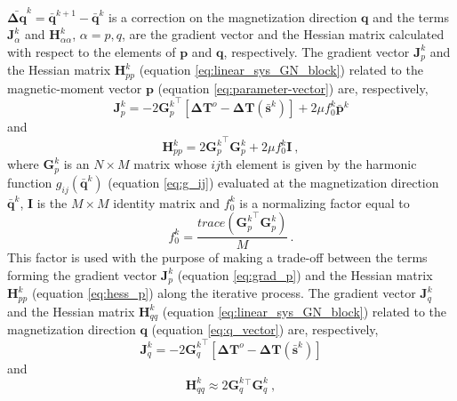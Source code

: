 $\bar{\mathbf{\Delta q}}^{k} = \bar{\mathbf{q}}^{k+1} - \bar{\mathbf{q}}^{k}$ 
is a correction on the magnetization direction $\mathbf{q}$ and the terms 
$\mathbf{J}_{\alpha}^{k}$ and $\mathbf{H}_{\alpha \alpha}^{k}$, $\alpha = p,q$, 
are the gradient vector and the Hessian matrix calculated with respect to the elements of 
$\mathbf{p}$ and $\mathbf{q}$, respectively. 
The gradient vector $\mathbf{J}_{p}^{k}$ and the Hessian matrix $\mathbf{H}_{pp}^{k}$ 
(equation \ref{eq:linear_sys_GN_block}) related to the magnetic-moment vector 
$\mathbf{p}$ (equation \ref{eq:parameter-vector}) are, respectively,
\begin{equation}
\mathbf{J}_{p}^{k} = -2 {\mathbf{G}_{p}^{k}}^{\top} 
\left[ \mathbf{\Delta T}^{o} - \mathbf{\Delta T} (\bar{\mathbf{s}}^{k}) \right] + 
2\mu f_{0}^{k} \bar{\mathbf{p}}^{k} 
\label{eq:grad_p}
\end{equation}   
and   
\begin{equation}
\mathbf{H}_{pp}^{k} = 2 {\mathbf{G}_{p}^{k}}^{\top} \mathbf{G}_{p}^{k} + 
2 \mu f_{0}^{k} \mathbf{I} \: ,
\label{eq:hess_p}
\end{equation}
where $\mathbf{G}_p^{k}$ is an $N \times M$ matrix whose $ij$th element is given by the harmonic 
function $g_{ij}(\bar{\mathbf{q}}^{k})$ (equation \ref{eq:g_ij}) evaluated at the 
magnetization direction $\bar{\mathbf{q}}^{k}$, $\mathbf{I}$ is the $M \times M$ identity matrix and 
$f_{0}^{k}$ is a  normalizing factor equal to
\begin{equation}
f_{0}^{k} = \dfrac{trace \left({\mathbf{G}_{p}^{k}}^{\top} \mathbf{G}_{p}^{k} \right)}{M} \, .
\label{eq:norm_factor}
\end{equation}
This factor is used with the purpose of making a trade-off between the terms 
forming the gradient vector $\mathbf{J}_{p}^{k}$ (equation \ref{eq:grad_p}) and 
the Hessian matrix $\mathbf{H}_{pp}^{k}$ (equation \ref{eq:hess_p}) 
along the iterative process. The gradient vector $\mathbf{J}_{q}^{k}$ and 
the Hessian matrix $\mathbf{H}_{qq}^{k}$ 
(equation \ref{eq:linear_sys_GN_block}) related to the magnetization direction 
$\mathbf{q}$ (equation \ref{eq:q_vector}) are, respectively,
\begin{equation}
\mathbf{J}_{q}^{k} = -2 {\mathbf{G}_{q}^{k}}^{\top} 
\left[ \mathbf{\Delta T}^{o} - \mathbf{\Delta T} (\bar{\mathbf{s}}^{k}) \right]
\label{eq:grad_q}
\end{equation}   
and   
\begin{equation}
\mathbf{H}_{qq}^{k} \approx 2 {\mathbf{G}_{q}^{k}}{^\top} \mathbf{G}_{q}^{k} \: ,
\label{eq:hess_q}
\end{equation}
